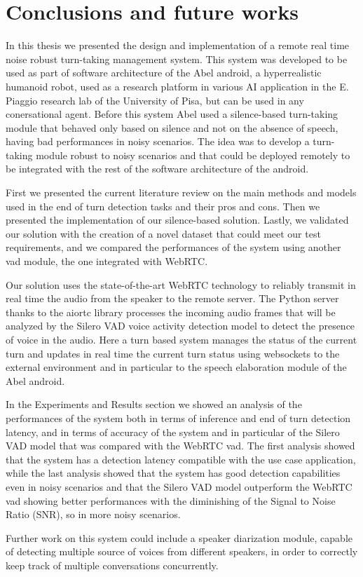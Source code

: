 \documentclass[../main.tex]{subfiles}
\begin{document}
\section{Conclusions and future works}

In this thesis we presented the design and implementation of a remote real time noise robust turn-taking management system. This system was developed to be used as part of software architecture of the Abel android, a hyperrealistic humanoid robot, used as a research platform in various AI application in the E. Piaggio research lab of the University of Pisa, but can be used in any conersational agent. Before this system Abel used a silence-based turn-taking module that behaved only based on silence and not on the absence of speech, having bad performances in noisy scenarios. The idea was to develop a turn-taking module robust to noisy scenarios and that could be deployed remotely to be integrated with the rest of the software architecture of the android.

First we presented the current literature review on the main methods and models used in the end of turn detection tasks and their pros and cons. Then we presented the implementation of our silence-based solution. Lastly, we validated our solution with the creation of a novel dataset that could meet our test requirements, and we compared the performances of the system using another vad module, the one integrated with WebRTC.

Our solution uses the state-of-the-art WebRTC technology to reliably transmit in real time the audio from the speaker to the remote server. The Python server thanks to the aiortc library processes the incoming audio frames that will be analyzed by the Silero VAD voice activity detection model to detect the presence of voice in the audio. Here a turn based system manages the status of the current turn and updates in real time the current turn status using websockets to the external environment and in particular to the speech elaboration module of the Abel android.

In the Experiments and Results section we showed an analysis of the performances of the system both in terms of inference and end of turn detection latency, and in terms of accuracy of the system and in particular of the Silero VAD model that was compared with the WebRTC vad. The first analysis showed that the system has a detection latency compatible with the use case application, while the last analysis showed that the system has good detection capabilities even in noisy scenarios and that the Silero VAD model outperform the WebRTC vad showing better performances with the diminishing of the Signal to Noise Ratio (SNR), so in more noisy scenarios.

Further work on this system could include a speaker diarization module, capable of detecting multiple source of voices from different speakers, in order to correctly keep track of multiple conversations concurrently. 
\end{document}
